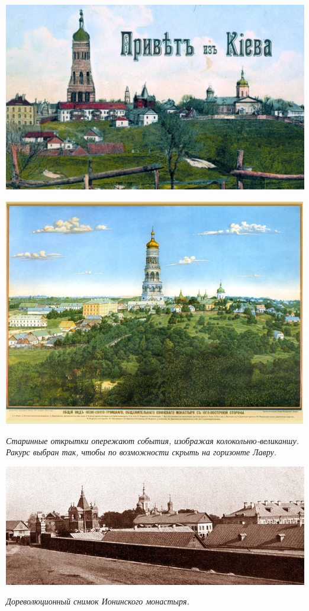 \newpage
\vspace*{\fill}
\begin{center}
\includegraphics[width=\linewidth]{chast-vosp/zver/kolo01.jpg}

\includegraphics[width=\linewidth]{chast-vosp/zver/kolo02.jpg}

\textit{Старинные открытки опережают события, изображая  колокольню-великаншу. Ракурс выбран так, чтобы по возможности скрыть на горизонте Лавру.}
\end{center}
\vspace*{\fill}
\newpage

\begin{center}
\includegraphics[width=\linewidth]{chast-vosp/zver/ion-complex.jpg}

\textit{Дореволюционный снимок Ионинского монастыря.}
\end{center}

